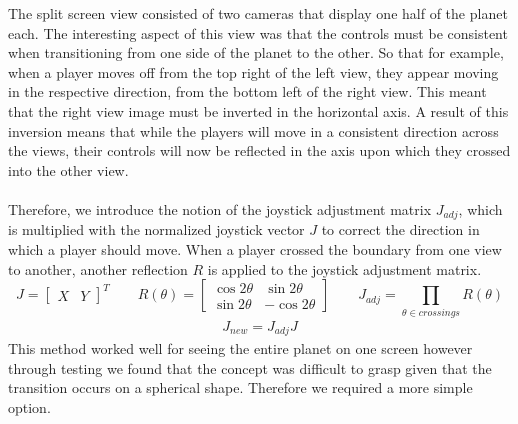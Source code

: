\documentclass[11pt,a4paper]{article}
\begin{document}
   The split screen view consisted of two cameras that display one half of the planet each. The interesting aspect of this view was that the controls must be consistent when transitioning from one side of the planet to the other. So that for example, when a player moves off from the top right of the left view, they appear moving in the respective direction, from the bottom left of the right view. This meant that the right view image must be inverted in the horizontal axis. A result of this inversion means that while the players will move in a consistent direction across the views, their controls will now be reflected in the axis upon which they crossed into the other view. \\ \\
   Therefore, we introduce the notion of the joystick adjustment matrix $J_{adj}$, which is multiplied with the normalized joystick vector $J$ to correct the direction in which a player should move. When a player crossed the boundary from one view to another, another reflection $R$ is applied to the joystick adjustment matrix. 
  \begin{equation}
     J=\begin{bmatrix}
         X & Y
        \end{bmatrix}^{T}
        \qquad
          R(\theta) = 
          \begin{bmatrix}
          \cos {2\theta} & \sin {2\theta} \\
          \sin {2\theta} & -\cos {2\theta}
          \end{bmatrix}
      \qquad
      J_{adj} = \prod_{\theta \in crossings}R({\theta})
  \end{equation}
  \begin{align*}
    J_{new} = J_{adj}J
  \end{align*}
  This method worked well for seeing the entire planet on one screen however through testing we found that the concept was difficult to grasp given that the transition occurs on a spherical shape. Therefore we required a more simple option.
\end{document}
